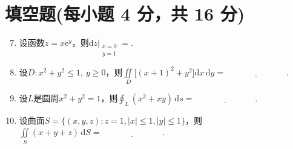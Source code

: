 \documentclass[../main.tex]{subfiles}
\begin{document}
\section{填空题(每小题 4 分，共 16 分)}
\begin{enumerate}
    \setcounter{enumi}{6}
    \item 设函数$z=x\mathrm{e}^{y}$，则$\mathrm{d}z\Big|_{\substack{x=0 \\ y=1}}=$\underline{\hspace{3cm}}.

    \item 设$D:x^{2}+y^{2}\leq1,\ y\geq0$，则$\iint\limits_{D}\bigl[(x+1)^{2}+y^{2}\bigr]\mathrm{d}x\,\mathrm{d}y=\underline{\hspace{3cm}}$.

    \item 设$L$是圆周$x^{2}+y^{2}=1$，则$\oint_{L}(x^2+xy)\,\mathrm{d}s=\underline{\hspace{3cm}}$.

    \item 设曲面$S=\{(x,y,z):z=1,|x|\leq1,|y|\leq1\}$，则$\iint\limits_{S}(x+y+z)\,\mathrm{d}S=\underline{\hspace{3cm}}$.
\end{enumerate}
\end{document}
